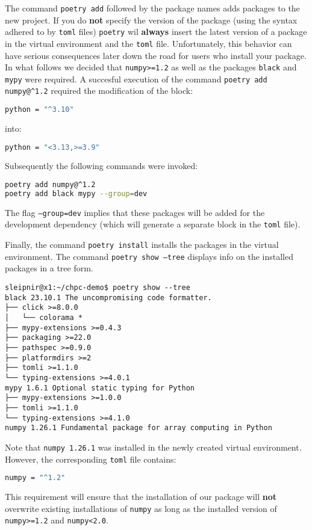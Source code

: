 \documentclass[10pt]{article}
\begin{document}
The command \texttt{poetry add} followed by the package names adds packages to the new project. 
If you do \textbf{not} specify the version of the package (using the syntax adhered to by \texttt{toml} files) 
\texttt{poetry} wil \textbf{always} insert 
the latest version of a package in the virtual environment and the \texttt{toml} file. Unfortunately,
this behavior can have serious consequences later down the road for users who install your package. 
In what follows we decided that \texttt{numpy>=1.2} as well as the packages \texttt{black} and \texttt{mypy} were required.
A succesful execution of the command \texttt{poetry add numpy@\textasciicircum1.2} required the modification of the block:
\begin{lstlisting}[language=bash]
python = "^3.10"
\end{lstlisting}
into:
\begin{lstlisting}[language=bash]
python = "<3.13,>=3.9"
\end{lstlisting}
Subsequently the following commands were invoked:
\begin{lstlisting}[language=bash]
poetry add numpy@^1.2
poetry add black mypy --group=dev
\end{lstlisting}
The flag \texttt{--group=dev} implies that these packages will be added for the development dependency 
(which will generate a separate block in the \texttt{toml} file).

Finally, the command \texttt{poetry install} installs the packages in the virtual environment. 
The command \texttt{poetry show --tree} displays info
on the installed packages in a tree form.

\begin{verbatim}
sleipnir@x1:~/chpc-demo$ poetry show --tree
black 23.10.1 The uncompromising code formatter.
├── click >=8.0.0
│   └── colorama * 
├── mypy-extensions >=0.4.3
├── packaging >=22.0
├── pathspec >=0.9.0
├── platformdirs >=2
├── tomli >=1.1.0
└── typing-extensions >=4.0.1
mypy 1.6.1 Optional static typing for Python
├── mypy-extensions >=1.0.0
├── tomli >=1.1.0
└── typing-extensions >=4.1.0
numpy 1.26.1 Fundamental package for array computing in Python
\end{verbatim}
Note that \texttt{numpy 1.26.1} was installed in the newly created virtual environment. 
However, the corresponding \texttt{toml} file contains:
\begin{lstlisting}[language=bash]
numpy = "^1.2"
\end{lstlisting}
This requirement will ensure that the installation of our package will \textbf{not} overwrite existing 
installations of \texttt{numpy} as long as the installed version of \texttt{numpy>=1.2} and \texttt{numpy<2.0}.
\end{document}
